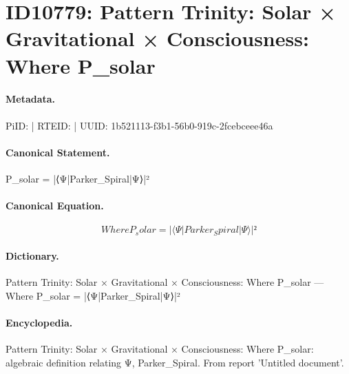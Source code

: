 \section*{ID10779: Pattern Trinity: Solar × Gravitational × Consciousness: Where P\_solar}
\paragraph{Metadata.}
PiID:  | RTEID:  | UUID: 1b521113-f3b1-56b0-919c-2fcebceee46a

\paragraph{Canonical Statement.}
P\_solar = |⟨Ψ|Parker\_Spiral|Ψ⟩|²

\paragraph{Canonical Equation.}
\[
Where P_solar = |⟨Ψ|Parker_Spiral|Ψ⟩|²
\]

\paragraph{Dictionary.}
Pattern Trinity: Solar × Gravitational × Consciousness: Where P\_solar — Where P\_solar = |⟨Ψ|Parker\_Spiral|Ψ⟩|²

\paragraph{Encyclopedia.}
Pattern Trinity: Solar × Gravitational × Consciousness: Where P\_solar: algebraic definition relating Ψ, Parker\_Spiral. From report 'Untitled document'.
